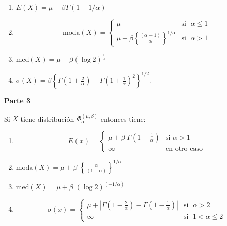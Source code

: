 \documentclass[
]{book}
\theoremstyle{definition}
\theoremstyle{definition}
\theoremstyle{definition}
\theoremstyle{definition}
\theoremstyle{remark}
\begin{document}
\begin{enumerate}
\def\labelenumi{\alph{enumi})}
\item
  \(E(X)=\mu -\beta \Gamma (1+1/\alpha)\)
\item
  \begin{equation*}\text{moda}(X) =\begin{cases}
    \mu  & \text{si }\; \alpha \leq 1 \\
   \mu-\beta\left\{ \frac{\left( \alpha-1 \right)}{\alpha} \right\}^{1/\alpha} & \text{si }\; \alpha >1
  \end{cases}\end{equation*}
\item
  \(\text{med}(X)=\mu - \beta (\log 2)^{\frac{1}{\alpha}}\)
\item
  \(\sigma(X)=\beta\left\{\Gamma\left( 1+\frac{2}{\alpha} \right)-\Gamma\left( 1+\frac{1}{\alpha} \right)^2  \right\}^{1/2}\).
\end{enumerate}

\textbf{Parte 3}

Si \(X\) tiene distribución \(\Phi_{\alpha}^{(\mu, \beta)}\) entonces tiene:

\begin{enumerate}
\def\labelenumi{\alph{enumi})}
\item
  \begin{equation*}
  E(x) =
  \begin{cases}
   \mu + \beta\;\Gamma\left( 1-\frac{1}{\alpha} \right) & \text{si } \alpha>1 \\
   \infty & \text{en otro caso}
  \end{cases}
  \end{equation*}
\item
  \(\text{moda}(X)=\mu+ \beta\;\left\{ \frac{\alpha}{\left( 1+ \alpha\right)}\right\}^{1/\alpha}\)
\item
  \(\text{med}(X)=\mu + \beta \;\left( \log 2 \right)^{\left( -1/\alpha \right)}\)
\item
  \begin{equation*}
  \sigma(x) =
  \begin{cases}
   \mu + \left| \Gamma \left( 1 - \frac{2}{\alpha} \right) - \Gamma \left(  1 - \frac{1}{\alpha}\right)\right|  & \text{si } \; \alpha>2 \\
   \infty & \text{si } \; 1<\alpha \leq 2
  \end{cases}
  \end{equation*}
\end{enumerate}
\end{document}
